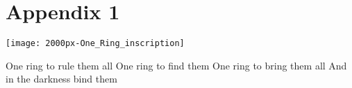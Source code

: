 \documentclass[11pt]{article}
\begin{document}
 \section{Appendix 1}
 
\begin{minipage}[c]{0.6\textwidth}
\begin{framed}
\texttt{[image: 2000px-One\_Ring\_inscription]}
\end{framed}
\end{minipage}
\begin{minipage}[c]{0.4\textwidth}
\begin{framed}
 One ring to rule them all \newline
 One ring to find them \newline
 One ring to bring them all \newline
 And in the darkness bind them 
\end{framed}
\end{minipage}

\end{document}
